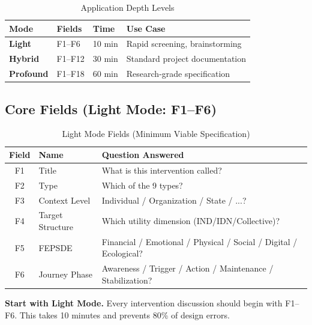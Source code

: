 \documentclass[11pt,a4paper]{article}
\begin{document}
\begin{table}[h]
\centering
\renewcommand{\arraystretch}{1.3}
\begin{tabular}{@{}llll@{}}
\toprule
\textbf{Mode} & \textbf{Fields} & \textbf{Time} & \textbf{Use Case} \\
\midrule
\textcolor{accentgreen}{\textbf{Light}} & F1--F6 & 10 min & Rapid screening, brainstorming \\
\textcolor{warningorange}{\textbf{Hybrid}} & F1--F12 & 30 min & Standard project documentation \\
\textcolor{primaryblue}{\textbf{Profound}} & F1--F18 & 60 min & Research-grade specification \\
\bottomrule
\end{tabular}
\caption{Application Depth Levels}
\end{table}

\subsection{Core Fields (Light Mode: F1--F6)}

\begin{table}[h]
\centering
\renewcommand{\arraystretch}{1.3}
\small
\begin{tabular}{@{}clp{7cm}@{}}
\toprule
\textbf{Field} & \textbf{Name} & \textbf{Question Answered} \\
\midrule
F1 & Title & What is this intervention called? \\
F2 & Type & Which of the 9 types? \\
F3 & Context Level & Individual / Organization / State / ...? \\
F4 & Target Structure & Which utility dimension (IND/IDN/Collective)? \\
F5 & FEPSDE & Financial / Emotional / Physical / Social / Digital / Ecological? \\
F6 & Journey Phase & Awareness / Trigger / Action / Maintenance / Stabilization? \\
\bottomrule
\end{tabular}
\caption{Light Mode Fields (Minimum Viable Specification)}
\end{table}

\begin{tcolorbox}[colback=accentgreen!10, colframe=accentgreen, title=\textbf{Recommendation}]
\textbf{Start with Light Mode.} Every intervention discussion should begin with F1--F6. This takes 10 minutes and prevents 80\% of design errors.
\end{tcolorbox}
\end{document}
